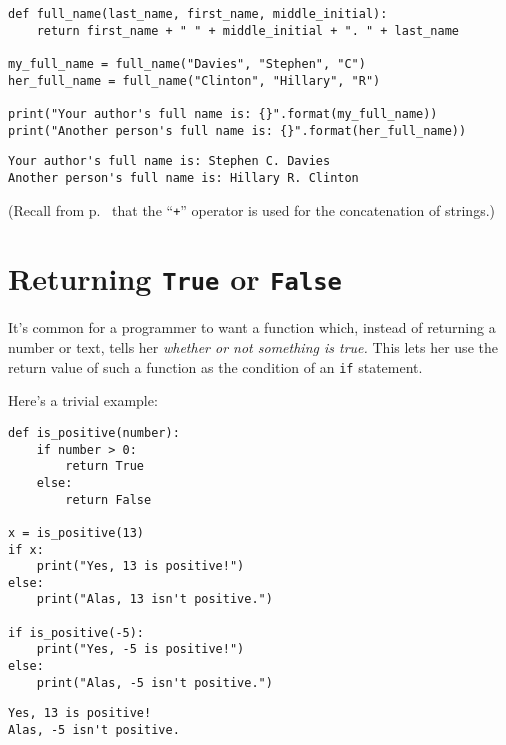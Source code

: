 \begin{Verbatim}[fontsize=\small,samepage=true,frame=single,framesep=3mm]
def full_name(last_name, first_name, middle_initial):
    return first_name + " " + middle_initial + ". " + last_name

my_full_name = full_name("Davies", "Stephen", "C")
her_full_name = full_name("Clinton", "Hillary", "R")

print("Your author's full name is: {}".format(my_full_name))
print("Another person's full name is: {}".format(her_full_name))
\end{Verbatim}
\vspace{-.2in}

\begin{Verbatim}[fontsize=\small,samepage=true,frame=leftline,framesep=5mm,framerule=1mm]
Your author's full name is: Stephen C. Davies
Another person's full name is: Hillary R. Clinton
\end{Verbatim}

(Recall from p.~\pageref{concatenatingStrings} that the ``\texttt{+}'' operator
is used for the concatenation of strings.)

\section{Returning \texttt{True} or \texttt{False}}

It's common for a programmer to want a function which, instead of returning a
number or text, tells her \textit{whether or not something is true.} This lets
her use the return value of such a function as the condition of an \texttt{if}
statement.

Here's a trivial example:

\begin{Verbatim}[fontsize=\small,samepage=true,frame=single,framesep=3mm]
def is_positive(number):
    if number > 0:
        return True
    else:
        return False

x = is_positive(13)
if x:
    print("Yes, 13 is positive!")
else:
    print("Alas, 13 isn't positive.")

if is_positive(-5):
    print("Yes, -5 is positive!")
else:
    print("Alas, -5 isn't positive.")
\end{Verbatim}
\vspace{-.2in}

\begin{Verbatim}[fontsize=\small,samepage=true,frame=leftline,framesep=5mm,framerule=1mm]
Yes, 13 is positive!
Alas, -5 isn't positive.
\end{Verbatim}

